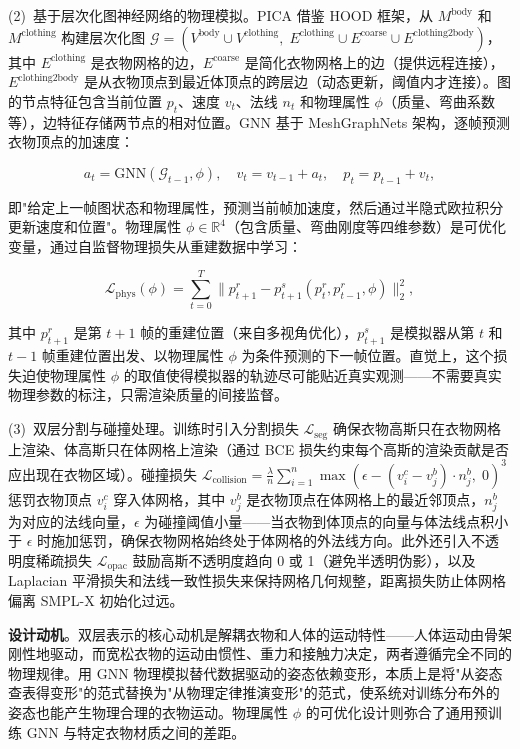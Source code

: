 (2)~基于层次化图神经网络的物理模拟。PICA 借鉴 HOOD 框架，从 $M^{\text{body}}$ 和 $M^{\text{clothing}}$ 构建层次化图 $\mathcal{G} = (V^{\text{body}} \cup V^{\text{clothing}},\; E^{\text{clothing}} \cup E^{\text{coarse}} \cup E^{\text{clothing2body}})$，其中 $E^{\text{clothing}}$ 是衣物网格的边，$E^{\text{coarse}}$ 是简化衣物网格上的边（提供远程连接），$E^{\text{clothing2body}}$ 是从衣物顶点到最近体顶点的跨层边（动态更新，阈值内才连接）。图的节点特征包含当前位置 $p_t$、速度 $v_t$、法线 $n_t$ 和物理属性 $\phi$（质量、弯曲系数等），边特征存储两节点的相对位置。GNN 基于 MeshGraphNets 架构，逐帧预测衣物顶点的加速度：

\begin{equation}
    a_t = \text{GNN}(\mathcal{G}_{t-1}, \phi), \quad v_t = v_{t-1} + a_t, \quad p_t = p_{t-1} + v_t,
\end{equation}

即"给定上一帧图状态和物理属性，预测当前帧加速度，然后通过半隐式欧拉积分更新速度和位置"。物理属性 $\phi \in \mathbb{R}^4$（包含质量、弯曲刚度等四维参数）是可优化变量，通过自监督物理损失从重建数据中学习：

\begin{equation}
    \mathcal{L}_{\text{phys}}(\phi) = \sum_{t=0}^{T} \| p_{t+1}^{r} - p_{t+1}^{s}(p_t^{r}, p_{t-1}^{r}, \phi) \|_2^2,
\end{equation}

其中 $p_{t+1}^{r}$ 是第 $t+1$ 帧的重建位置（来自多视角优化），$p_{t+1}^{s}$ 是模拟器从第 $t$ 和 $t-1$ 帧重建位置出发、以物理属性 $\phi$ 为条件预测的下一帧位置。直觉上，这个损失迫使物理属性 $\phi$ 的取值使得模拟器的轨迹尽可能贴近真实观测——不需要真实物理参数的标注，只需渲染质量的间接监督。

(3)~双层分割与碰撞处理。训练时引入分割损失 $\mathcal{L}_{\text{seg}}$ 确保衣物高斯只在衣物网格上渲染、体高斯只在体网格上渲染（通过 BCE 损失约束每个高斯的渲染贡献是否应出现在衣物区域）。碰撞损失 $\mathcal{L}_{\text{collision}} = \frac{\lambda}{n} \sum_{i=1}^{n} \max(\epsilon - (v_i^c - v_j^b) \cdot n_j^b,\; 0)^3$ 惩罚衣物顶点 $v_i^c$ 穿入体网格，其中 $v_j^b$ 是衣物顶点在体网格上的最近邻顶点，$n_j^b$ 为对应的法线向量，$\epsilon$ 为碰撞阈值小量——当衣物到体顶点的向量与体法线点积小于 $\epsilon$ 时施加惩罚，确保衣物网格始终处于体网格的外法线方向。此外还引入不透明度稀疏损失 $\mathcal{L}_{\text{opac}}$ 鼓励高斯不透明度趋向 0 或 1（避免半透明伪影），以及 Laplacian 平滑损失和法线一致性损失来保持网格几何规整，距离损失防止体网格偏离 SMPL-X 初始化过远。

\textbf{设计动机}。双层表示的核心动机是解耦衣物和人体的运动特性——人体运动由骨架刚性地驱动，而宽松衣物的运动由惯性、重力和接触力决定，两者遵循完全不同的物理规律。用 GNN 物理模拟替代数据驱动的姿态依赖变形，本质上是将"从姿态查表得变形"的范式替换为"从物理定律推演变形"的范式，使系统对训练分布外的姿态也能产生物理合理的衣物运动。物理属性 $\phi$ 的可优化设计则弥合了通用预训练 GNN 与特定衣物材质之间的差距。

